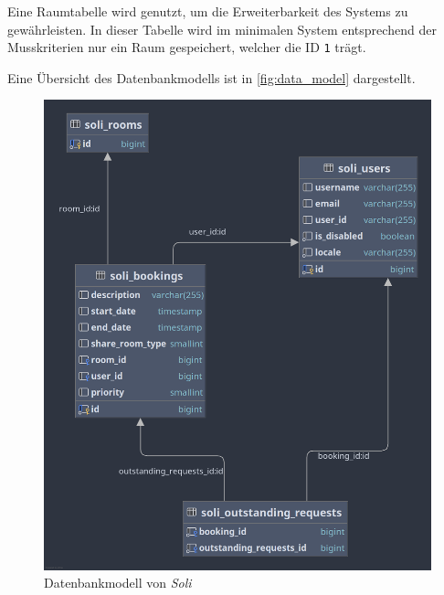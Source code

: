 Eine Raumtabelle wird genutzt, um die Erweiterbarkeit des Systems zu gewährleisten.
In dieser Tabelle wird im minimalen System entsprechend der Musskriterien nur ein Raum gespeichert, welcher die ID \texttt{1} trägt.

Eine Übersicht des Datenbankmodells ist in \autoref{fig:data_model} dargestellt.

\begin{figure}[ht]
    \centering
    \includegraphics[width=\textwidth]{figures/database}
    \caption{Datenbankmodell von \textit{Soli}}
    \label{fig:data_model}
\end{figure}
\pagebreak


